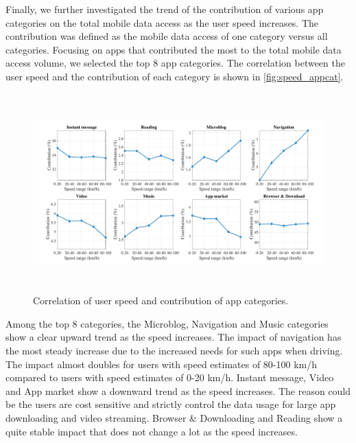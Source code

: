 
Finally, we further investigated the trend of the contribution of various app categories on the total mobile data access as the user speed increases.
The contribution was defined as the mobile data access of one category versus all categories.
Focusing on apps that contributed the most to the total mobile data access volume,
we selected the top 8 app categories.
The correlation between the user speed and the contribution of each category is shown in \autoref{fig:speed_appcat}.


\begin{figure}[h]
    \centering
    \includegraphics[width=\linewidth,height=3in]{./figures/large_font/speed_appcat.pdf}
    \vspace{-0.3in}
    \caption{Correlation of user speed and contribution of app categories.}
    \label{fig:speed_appcat}
\end{figure}

Among the top 8 categories, the Microblog, Navigation and Music categories show a clear upward trend as the speed increases.
The impact of navigation has the most steady increase due to the increased needs for such apps when driving.
The impact almost doubles for users with speed estimates of 80-100 km/h compared to users with speed estimates of 0-20 km/h.
Instant message, Video and App market show a downward trend as the speed increases.
The reason could be the users are cost sensitive and strictly control the data usage for large app downloading and video streaming.
Browser \& Downloading and Reading show a quite stable impact that does not change a lot as the speed increases.







